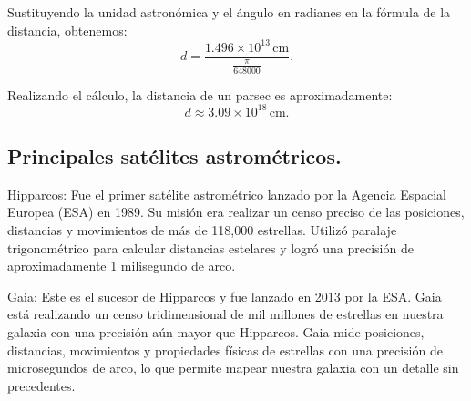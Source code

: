 \documentclass{article}
\begin{document}
Sustituyendo la unidad astronómica y el ángulo en radianes en la fórmula de la distancia, obtenemos:
\[
d = \frac{1.496 \times 10^{13} \, \text{cm}}{\frac{\pi}{648000}}.
\]

Realizando el cálculo, la distancia de un parsec es aproximadamente:
\[
d \approx 3.09 \times 10^{18} \, \text{cm}.
\]

\subsection*{Principales satélites astrométricos.}
Hipparcos: Fue el primer satélite astrométrico lanzado por la Agencia Espacial Europea (ESA) en 1989. Su misión era realizar un censo preciso de las posiciones, distancias y movimientos de más de 118,000 estrellas. Utilizó paralaje trigonométrico para calcular distancias estelares y logró una precisión de aproximadamente 1 milisegundo de arco.

Gaia: Este es el sucesor de Hipparcos y fue lanzado en 2013 por la ESA. Gaia está realizando un censo tridimensional de mil millones de estrellas en nuestra galaxia con una precisión aún mayor que Hipparcos. Gaia mide posiciones, distancias, movimientos y propiedades físicas de estrellas con una precisión de microsegundos de arco, lo que permite mapear nuestra galaxia con un detalle sin precedentes.
\end{document}

